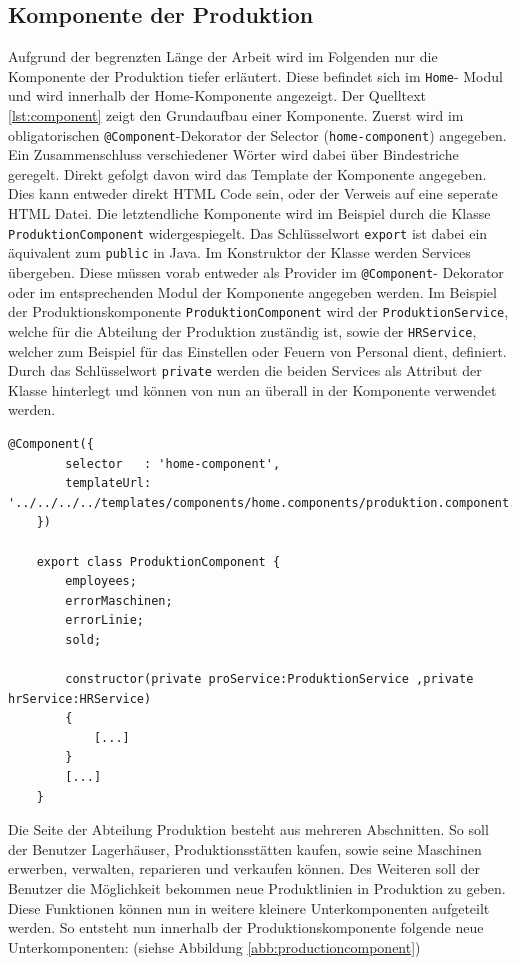 \subsection{Komponente der Produktion}

Aufgrund der begrenzten Länge der Arbeit wird im Folgenden nur die Komponente der Produktion tiefer erläutert. Diese befindet sich im \texttt{Home}- Modul und wird innerhalb der Home-Komponente angezeigt. 
Der Quelltext \ref{lst:component} zeigt den Grundaufbau einer Komponente. Zuerst wird im obligatorischen \texttt{@Component}-Dekorator der Selector (\texttt{home-component}) angegeben. Ein Zusammenschluss verschiedener Wörter wird dabei über Bindestriche geregelt. Direkt gefolgt davon wird das Template der Komponente angegeben. Dies kann entweder direkt HTML Code sein, oder der Verweis auf eine seperate HTML Datei.
Die letztendliche Komponente wird im Beispiel durch die Klasse \texttt{ProduktionComponent} widergespiegelt. Das Schlüsselwort \texttt{export} ist dabei ein äquivalent zum \texttt{public} in Java. Im Konstruktor der Klasse werden Services übergeben. Diese müssen vorab entweder als Provider im \texttt{@Component}- Dekorator oder im entsprechenden Modul der Komponente angegeben werden.
Im Beispiel der Produktionskomponente \texttt{ProduktionComponent} wird der \texttt{ProduktionService}, welche für die Abteilung der Produktion zuständig ist, sowie der \texttt{HRService}, welcher zum Beispiel für das Einstellen oder Feuern von Personal dient, definiert. Durch das Schlüsselwort \texttt{private} werden die beiden Services als Attribut der Klasse hinterlegt und können von nun an überall in der Komponente verwendet werden.

\lstset{language=Java}
\begin{lstlisting}[float=htbp, caption={Grundaufbau einer Komponente}, label={lst:component}]
	@Component({
		selector   : 'home-component',
		templateUrl: '../../../../templates/components/home.components/produktion.component.html',
	})

	export class ProduktionComponent {
		employees;
		errorMaschinen;
		errorLinie;
		sold;
	
		constructor(private proService:ProduktionService ,private hrService:HRService)
		{
			[...]
		}	
		[...]
	}

\end{lstlisting}

Die Seite der Abteilung Produktion besteht aus mehreren Abschnitten. So soll der Benutzer Lagerhäuser, Produktionsstätten kaufen, sowie seine Maschinen erwerben, verwalten, reparieren und verkaufen können. Des Weiteren soll der Benutzer die Möglichkeit bekommen neue Produktlinien in Produktion zu geben. Diese Funktionen können nun in weitere kleinere Unterkomponenten aufgeteilt werden. So entsteht nun innerhalb der Produktionskomponente folgende neue Unterkomponenten: (siehse Abbildung \ref{abb:productioncomponent})


